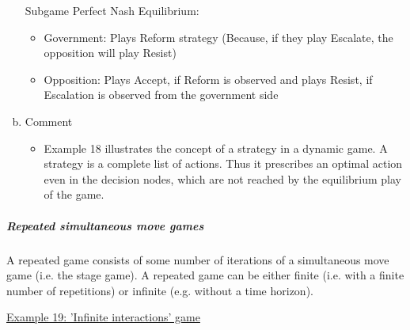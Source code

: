 \begin{enumerate}[a)]
        Subgame Perfect Nash Equilibrium:
        \begin{itemize}
            \item Government: Plays Reform strategy (Because, if they play
                Escalate, the opposition will play Resist)
            \item Opposition: Plays Accept, if Reform is observed and plays
                Resist, if Escalation is observed from the government side
        \end{itemize}
    \item Comment
        \begin{itemize}
            \item Example 18 illustrates the concept of a strategy in a dynamic
                game. A strategy is a complete list of actions. Thus it prescribes
                an optimal action even in the decision nodes, which are not reached
                by the equilibrium play of the game.
        \end{itemize}
\end{enumerate}

\subparagraph{Repeated simultaneous move games}

A repeated game consists of some number of iterations of a simultaneous move game
(i.e. the stage game). A repeated game can be either finite (i.e. with a finite
number of repetitions) or infinite (e.g. without a time horizon).

\vspace{1\baselineskip}

\underline{Example 19: 'Infinite interactions' game}

